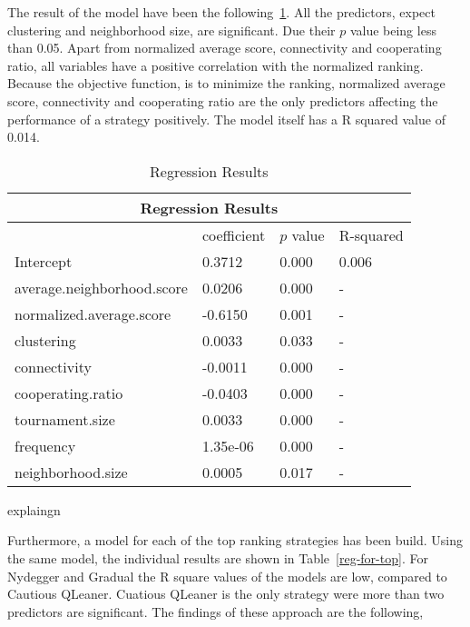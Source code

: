 The result of the model have been the following~\ref{regression-complex-networks}.
All the predictors, expect clustering and neighborhood size, are significant.
Due their \(p\) value being less than 0.05.
Apart from normalized average score, connectivity and cooperating ratio, all
variables have a positive correlation with the normalized ranking. Because the
objective function, is to minimize the ranking, normalized average score,
connectivity and cooperating ratio are the only predictors affecting the performance
of a strategy positively. The model itself has a R squared value of 0.014.

\begin{table}[!hbtp]
	\centering
	\begin{adjustbox}{width=0.5\textwidth}
		\small
		\begin{tabular}{|l|l|l|l|}
			\hline
			\multicolumn{4}{|c|}{Regression Results}         \\ \hline
			                           & coefficient & \(p\) value & R-squared \\ \hline
			Intercept                  & 0.3712      & 0.000       & 0.006     \\ \hline
			average.neighborhood.score & 0.0206      & 0.000       & -         \\ \hline
			normalized.average.score   & -0.6150     & 0.001       & -         \\ \hline
			clustering                 & 0.0033      & 0.033       & -         \\ \hline
			connectivity               & -0.0011     & 0.000       & -         \\ \hline
			cooperating.ratio          & -0.0403     & 0.000       & -         \\ \hline
			tournament.size            & 0.0033      & 0.000       & -         \\ \hline
			frequency                  & 1.35e-06    & 0.000       & -         \\ \hline
			neighborhood.size          & 0.0005      & 0.017       & -         \\ \hline

		\end{tabular}
	\end{adjustbox}
	\caption{Regression Results}
	\label{regression-complex-networks}
	explaingn
\end{table}

Furthermore, a model for each of the top ranking strategies has been build.
Using the same model, the individual results are shown in Table~\ref{reg-for-top}.
For Nydegger and Gradual the R square values of the models are low, compared
to Cautious QLeaner. Cuatious QLeaner is the only strategy were more than two
predictors are significant. The findings of these approach are the following,

